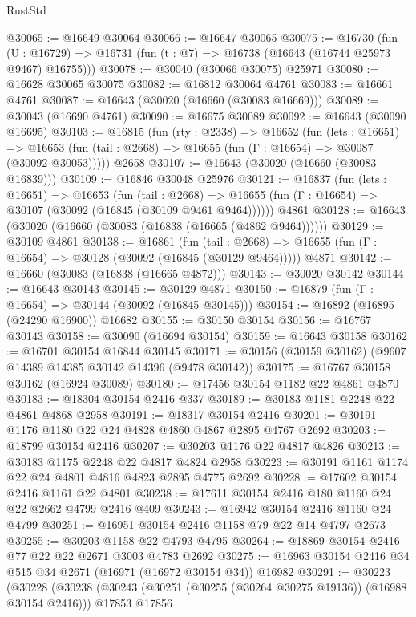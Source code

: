 \begin{lexlean}{RustStd}
\begin{coremodule}
@30065 := @16649 @30064
@30066 := @16647 @30065
@30075 := @16730
    (fun (U : @16729) => @16731 (fun (t : @7) => @16738 (@16643 (@16744 @25973 @9467) @16755)))
@30078 := @30040 (@30066 @30075) @25971
@30080 := @16628 @30065 @30075
@30082 := @16812 @30064 @4761
@30083 := @16661 @4761
@30087 := @16643 (@30020 (@16660 (@30083 @16669)))
@30089 := @30043 (@16690 @4761)
@30090 := @16675 @30089
@30092 := @16643 (@30090 @16695)
@30103 := @16815
    (fun (rty : @2338) =>
    @16652
      (fun (lets : @16651) =>
      @16653 (fun (tail : @2668) => @16655 (fun (Γ : @16654) => @30087 (@30092 @30053)))))
    @2658
@30107 := @16643 (@30020 (@16660 (@30083 @16839)))
@30109 := @16846 @30048 @25976
@30121 := @16837
    (fun (lets : @16651) =>
    @16653
      (fun (tail : @2668) =>
      @16655 (fun (Γ : @16654) => @30107 (@30092 (@16845 (@30109 @9461 @9464))))))
    @4861
@30128 := @16643 (@30020 (@16660 (@30083 (@16838 (@16665 (@4862 @9464))))))
@30129 := @30109 @4861
@30138 := @16861
    (fun (tail : @2668) => @16655 (fun (Γ : @16654) => @30128 (@30092 (@16845 (@30129 @9464)))))
    @4871
@30142 := @16660 (@30083 (@16838 (@16665 @4872)))
@30143 := @30020 @30142
@30144 := @16643 @30143
@30145 := @30129 @4871
@30150 := @16879 (fun (Γ : @16654) => @30144 (@30092 (@16845 @30145)))
@30154 := @16892 (@16895 (@24290 @16900)) @16682
@30155 := @30150 @30154
@30156 := @16767 @30143
@30158 := @30090 (@16694 @30154)
@30159 := @16643 @30158
@30162 := @16701 @30154 @16844 @30145
@30171 := @30156 (@30159 @30162) (@9607 @14389 @14385 @30142 @14396 (@9478 @30142))
@30175 := @16767 @30158 @30162 (@16924 @30089)
@30180 := @17456 @30154 @1182 @22 @4861 @4870
@30183 := @18304 @30154 @2416 @337
@30189 := @30183 @1181 @2248 @22 @4861 @4868 @2958
@30191 := @18317 @30154 @2416
@30201 := @30191 @1176 @1180 @22 @24 @4828 @4860 @4867 @2895 @4767 @2692
@30203 := @18799 @30154 @2416
@30207 := @30203 @1176 @22 @4817 @4826
@30213 := @30183 @1175 @2248 @22 @4817 @4824 @2958
@30223 := @30191 @1161 @1174 @22 @24 @4801 @4816 @4823 @2895 @4775 @2692
@30228 := @17602 @30154 @2416 @1161 @22 @4801
@30238 := @17611 @30154 @2416 @180 @1160 @24 @22 @2662 @4799 @2416 @409
@30243 := @16942 @30154 @2416 @1160 @24 @4799
@30251 := @16951 @30154 @2416 @1158 @79 @22 @14 @4797 @2673
@30255 := @30203 @1158 @22 @4793 @4795
@30264 := @18869 @30154 @2416 @77 @22 @22 @2671 @3003 @4783 @2692
@30275 := @16963 @30154 @2416 @34 @515 @34 @2671 (@16971 (@16972 @30154 @34)) @16982
@30291 := @30223
    (@30228
      (@30238
        (@30243 (@30251 (@30255 (@30264 @30275 @19136)) (@16988 @30154 @2416)))
        @17853
        @17856

\end{coremodule}
\end{lexlean}
